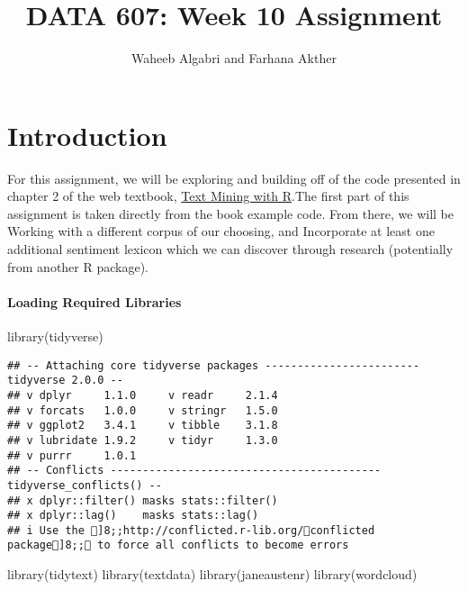 \documentclass[
]{article}
\title{DATA 607: Week 10 Assignment}
\author{Waheeb Algabri and Farhana Akther}
\date{}
\newenvironment{Shaded}{\begin{snugshade}}{\end{snugshade}}
\newcommand{\FunctionTok}[1]{\textcolor[rgb]{0.00,0.00,0.00}{#1}}
\newcommand{\NormalTok}[1]{#1}
\begin{document}
\maketitle

\hypertarget{introduction}{%
\section{Introduction}\label{introduction}}

For this assignment, we will be exploring and building off of the code
presented in chapter 2 of the web textbook,
\href{https://www.tidytextmining.com/sentiment.html}{Text Mining with
R}.The first part of this assignment is taken directly from the book
example code. From there, we will be Working with a different corpus of
our choosing, and Incorporate at least one additional sentiment lexicon
which we can discover through research (potentially from another R
package).

\hypertarget{loading-required-libraries}{%
\paragraph{Loading Required
Libraries}\label{loading-required-libraries}}

\begin{Shaded}
\begin{Highlighting}[]
\FunctionTok{library}\NormalTok{(tidyverse)}
\end{Highlighting}
\end{Shaded}

\begin{verbatim}
## -- Attaching core tidyverse packages ------------------------ tidyverse 2.0.0 --
## v dplyr     1.1.0     v readr     2.1.4
## v forcats   1.0.0     v stringr   1.5.0
## v ggplot2   3.4.1     v tibble    3.1.8
## v lubridate 1.9.2     v tidyr     1.3.0
## v purrr     1.0.1     
## -- Conflicts ------------------------------------------ tidyverse_conflicts() --
## x dplyr::filter() masks stats::filter()
## x dplyr::lag()    masks stats::lag()
## i Use the ]8;;http://conflicted.r-lib.org/conflicted package]8;; to force all conflicts to become errors
\end{verbatim}

\begin{Shaded}
\begin{Highlighting}[]
\FunctionTok{library}\NormalTok{(tidytext)}
\FunctionTok{library}\NormalTok{(textdata)}
\FunctionTok{library}\NormalTok{(janeaustenr)}
\FunctionTok{library}\NormalTok{(wordcloud)}
\end{Highlighting}
\end{Shaded}
\end{document}
